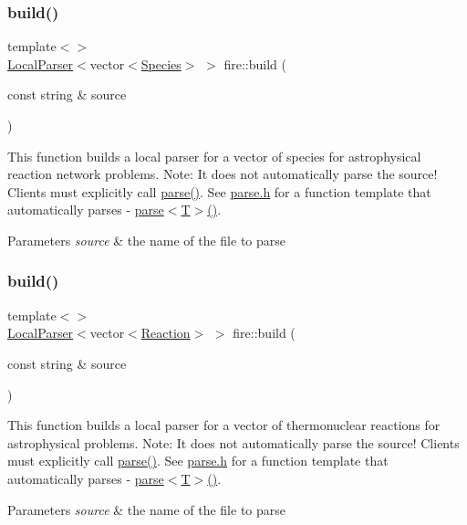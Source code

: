 \subsubsection{\texorpdfstring{build()}{build()}\hspace{0.1cm}{\footnotesize\ttfamily [3/6]}}
{\footnotesize\ttfamily template$<$$>$ \\
\hyperlink{a00778}{Local\+Parser}$<$vector$<$\hyperlink{a00742}{Species}$>$ $>$ fire\+::build (\begin{DoxyParamCaption}\item[{const string \&}]{source }\end{DoxyParamCaption})}

This function builds a local parser for a vector of species for astrophysical reaction network problems. Note\+: It does not automatically parse the source! Clients must explicitly call \hyperlink{a00171_a2b47cfd8a5d8711cdc55e1397487b90b}{parse()}. See \hyperlink{a00074_source}{parse.\+h} for a function template that automatically parses -\/ \hyperlink{a00171_a2b47cfd8a5d8711cdc55e1397487b90b}{parse$<$\+T$>$()}. 
\begin{DoxyParams}{Parameters}
{\em source} & the name of the file to parse \\
\hline
\end{DoxyParams}
\mbox{\label{a00171_aaf82cc265522a41ebc36e8405e0c7559}} 
\subsubsection{\texorpdfstring{build()}{build()}\hspace{0.1cm}{\footnotesize\ttfamily [4/6]}}
{\footnotesize\ttfamily template$<$$>$ \\
\hyperlink{a00778}{Local\+Parser}$<$vector$<$\hyperlink{a00734}{Reaction}$>$ $>$ fire\+::build (\begin{DoxyParamCaption}\item[{const string \&}]{source }\end{DoxyParamCaption})}

This function builds a local parser for a vector of thermonuclear reactions for astrophysical problems. Note\+: It does not automatically parse the source! Clients must explicitly call \hyperlink{a00171_a2b47cfd8a5d8711cdc55e1397487b90b}{parse()}. See \hyperlink{a00074_source}{parse.\+h} for a function template that automatically parses -\/ \hyperlink{a00171_a2b47cfd8a5d8711cdc55e1397487b90b}{parse$<$\+T$>$()}. 
\begin{DoxyParams}{Parameters}
{\em source} & the name of the file to parse \\
\hline
\end{DoxyParams}
\mbox{\label{a00171_a624f274bd6de1d7b829c9883ac3397cd}} 
